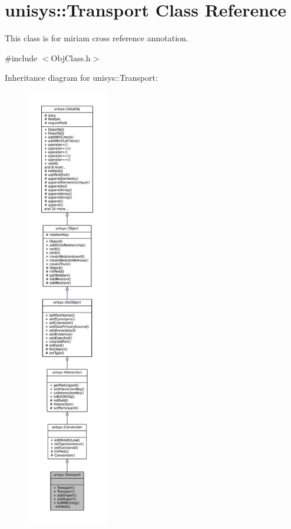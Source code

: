 \hypertarget{classunisys_1_1Transport}{\section{unisys\-:\-:Transport Class Reference}
\label{classunisys_1_1Transport}
}


This class is for miriam cross reference annotation.  




{\ttfamily \#include $<$Obj\-Class.\-h$>$}



Inheritance diagram for unisys\-:\-:Transport\-:
\nopagebreak
\begin{figure}[H]
\begin{center}
\leavevmode
\includegraphics[height=550pt]{classunisys_1_1Transport__inherit__graph}
\end{center}
\end{figure}


